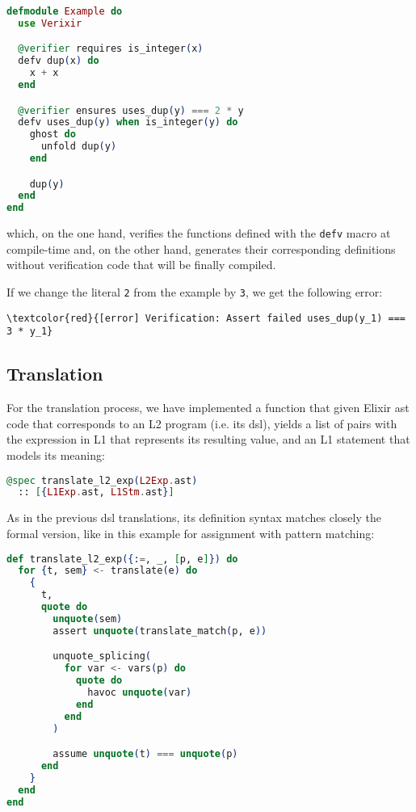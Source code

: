 \begin{lstlisting}[language=elixir,numbers=none,frame=none]
defmodule Example do
  use Verixir 

  @verifier requires is_integer(x)
  defv dup(x) do
    x + x
  end

  @verifier ensures uses_dup(y) === 2 * y
  defv uses_dup(y) when is_integer(y) do
    ghost do 
      unfold dup(y)
    end

    dup(y)
  end
end
\end{lstlisting}

which, on the one hand, verifies the functions defined with the \verb|defv|
macro at compile-time and, on the other hand, generates their corresponding
definitions without verification code that will be finally compiled.

If we change the literal \verb|2| from the example by \verb|3|, we get the
following error:

\begin{Verbatim}[commandchars=\\\{\}]
      \textcolor{red}{[error] Verification: Assert failed uses_dup(y_1) === 3 * y_1}
\end{Verbatim}

\subsection{Translation}
For the translation process, we have implemented a function that given Elixir \gls{ast}
code that corresponds to an L2 program (i.e. its \gls{dsl}), yields a list of
pairs with the expression in L1 that represents its resulting value, and an L1
statement that models its meaning:

\begin{lstlisting}[language=elixir,numbers=none,frame=none]
@spec translate_l2_exp(L2Exp.ast) 
  :: [{L1Exp.ast, L1Stm.ast}]
\end{lstlisting}

As in the previous \gls{dsl} translations, its definition syntax matches closely
the formal version, like in this example for assignment with pattern matching:

\begin{lstlisting}[language=elixir,numbers=none,frame=none]
def translate_l2_exp({:=, _, [p, e]}) do
  for {t, sem} <- translate(e) do
    {
      t,
      quote do
        unquote(sem)
        assert unquote(translate_match(p, e))

        unquote_splicing(
          for var <- vars(p) do
            quote do
              havoc unquote(var)
            end
          end
        )

        assume unquote(t) === unquote(p)
      end
    }
  end
end
\end{lstlisting}

